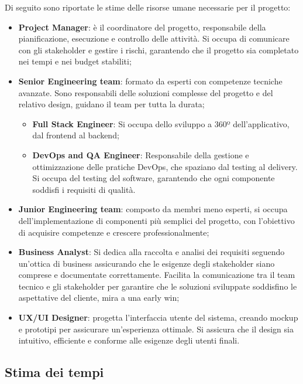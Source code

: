 \documentclass[a4paper,12pt, openright]{report}
\begin{document}
Di seguito sono riportate le stime delle risorse umane necessarie per il progetto:
\begin{itemize}
    \item \textbf{Project Manager}: è il coordinatore del progetto, responsabile della pianificazione, esecuzione e controllo delle attività. Si occupa di comunicare con gli stakeholder e gestire i rischi, garantendo che il progetto sia completato nei tempi e nei budget stabiliti;

    \item \textbf{Senior Engineering team}: formato da esperti con competenze tecniche avanzate. Sono responsabili delle soluzioni complesse del progetto e del relativo design, guidano il team per tutta la durata;
    \begin{itemize}
        \item \textbf{Full Stack Engineer}: Si occupa dello sviluppo a 360º dell'applicativo, dal frontend al backend;
        \item \textbf{DevOps and QA Engineer}: Responsabile della gestione e ottimizzazione delle pratiche DevOps, che spaziano dal testing al delivery. Si occupa del testing del software, garantendo che ogni componente soddisfi i requisiti di qualità.
    \end{itemize}

    \item \textbf{Junior Engineering team}: composto da membri meno esperti, si occupa dell'implementazione di componenti più semplici del progetto, con l'obiettivo di acquisire competenze e crescere professionalmente;

    \item \textbf{Business Analyst}: Si dedica alla raccolta e analisi dei requisiti seguendo un'ottica di business assicurando che le esigenze degli stakeholder siano comprese e documentate correttamente. Facilita la comunicazione tra il team tecnico e gli stakeholder per garantire che le soluzioni sviluppate soddisfino le aspettative del cliente, mira a una early win;
    
    \item \textbf{UX/UI Designer}: progetta l'interfaccia utente del sistema, creando mockup e prototipi per assicurare un'esperienza ottimale. Si assicura che il design sia intuitivo, efficiente e conforme alle esigenze degli utenti finali.
    
\end{itemize}

\subsection{Stima dei tempi}
\end{document}
